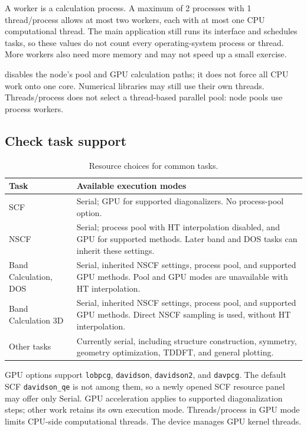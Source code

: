 A worker is a calculation process. A maximum of 2 processes with 1 thread/process allows at most two workers, each with at most one CPU computational thread. The main application still runs its interface and schedules tasks, so these values do not count every operating-system process or thread. More workers also need more memory and may not speed up a small exercise.

 disables the node's pool and GPU calculation paths; it does not force all CPU work onto one core. Numerical libraries may still use their own threads. Threads/process does not select a thread-based parallel pool: node pools use process workers.

\subsection{Check task support}

\begin{table}[!htb]
\centering
\caption{Resource choices for common tasks.}
\label{tab:node-resource-support}
\begin{tabularx}{\linewidth}{p{.29\linewidth}X}
\toprule
Task & Available execution modes \\
\midrule
SCF & Serial; GPU for supported diagonalizers. No process-pool option.\\
NSCF & Serial; process pool with HT interpolation disabled, and GPU for supported methods. Later band and DOS tasks can inherit these settings.\\
Band Calculation, DOS & Serial, inherited NSCF settings, process pool, and supported GPU methods. Pool and GPU modes are unavailable with HT interpolation.\\
Band Calculation 3D & Serial, inherited NSCF settings, process pool, and supported GPU methods. Direct NSCF sampling is used, without HT interpolation.\\
Other tasks & Currently serial, including structure construction, symmetry, geometry optimization, TDDFT, and general plotting.\\
\bottomrule
\end{tabularx}
\end{table}

GPU options support \texttt{lobpcg}, \texttt{davidson}, \texttt{davidson2}, and \texttt{davpcg}. The default SCF \texttt{davidson\_qe} is not among them, so a newly opened SCF resource panel may offer only Serial. GPU acceleration applies to supported diagonalization steps; other work retains its own execution mode. Threads/process in GPU mode limits CPU-side computational threads. The device manages GPU kernel threads.

